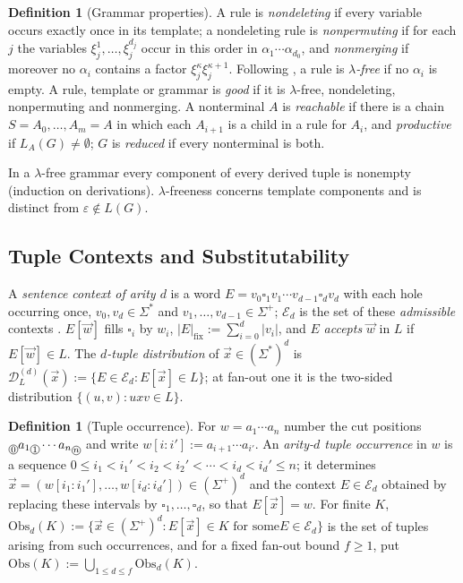 \documentclass[11pt]{article}
\numberwithin{equation}{section}
\theoremstyle{plain}
\theoremstyle{definition}
\newtheorem{definition}[theorem]{Definition}
\theoremstyle{remark}
\newcommand{\D}{\mathcal{D}}
\newcommand{\tuple}[1]{\vec{#1}}
\newcommand{\blank}{\square}
\newcommand{\eps}{\varepsilon}
\newcommand{\cutpos}[1]{%
  \raisebox{-0.7ex}{%
    \tikz[baseline=(char.base)]{%
      \node[draw,circle,inner sep=0.4pt,font=\scriptsize]
        (char) {\ensuremath{#1}};%
    }%
  }%
}
\begin{document}
\begin{definition}[Grammar properties]
\label{def:grammar-properties}
A rule is \emph{nondeleting} if every variable occurs exactly once in its
template; a nondeleting rule is \emph{nonpermuting} if for each $j$ the
variables $\xi_j^1,\ldots,\xi_j^{d_j}$ occur in this order in
$\alpha_1\cdots\alpha_{d_0}$, and \emph{nonmerging} if moreover no $\alpha_i$
contains a factor $\xi_j^\kappa\xi_j^{\kappa+1}$.  Following
\cite[Section~2.3]{Yoshinaka2011}, a rule is \emph{$\lambda$-free} if no
$\alpha_i$ is empty.  A rule, template or grammar is \emph{good} if it is
$\lambda$-free, nondeleting, nonpermuting and nonmerging.  A nonterminal $A$
is \emph{reachable} if there is a chain $S=A_0,\ldots,A_m=A$ in which each
$A_{i+1}$ is a child in a rule for $A_i$, and \emph{productive} if
$L_A(G)\ne\emptyset$; $G$ is \emph{reduced} if every nonterminal is both.
\end{definition}

In a $\lambda$-free grammar every component of every derived tuple is nonempty
(induction on derivations).  $\lambda$-freeness concerns template components
and is distinct from $\eps\notin L(G)$.

\subsection{Tuple Contexts and Substitutability}

A \emph{sentence context of arity $d$} is a word
$E=v_0\blank_1v_1\cdots v_{d-1}\blank_dv_d$ with each hole occurring once,
$v_0,v_d\in\Sigma^*$ and $v_1,\ldots,v_{d-1}\in\Sigma^+$; $\mathcal E_d$ is the
set of these \emph{admissible} contexts \cite[Section~3.1]{Yoshinaka2011}.
$E[\tuple w]$ fills $\blank_i$ by $w_i$, $|E|_{\mathrm{fix}}:=\sum_{i=0}^d|v_i|$,
and $E$ \emph{accepts} $\tuple w$ in $L$ if $E[\tuple w]\in L$.  The
\emph{$d$-tuple distribution} of $\tuple x\in(\Sigma^*)^d$ is
$\D_L^{(d)}(\tuple x):=\{E\in\mathcal E_d:E[\tuple x]\in L\}$; at fan-out one
it is the two-sided distribution $\{(u,v):uxv\in L\}$.

\begin{definition}[Tuple occurrence]
\label{def:tuple-occurrence}
For $w=a_1\cdots a_n$ number the cut positions
$\cutpos{0}a_1\cutpos{1}\cdots a_n\cutpos{n}$ and write
$w[i:i']:=a_{i+1}\cdots a_{i'}$.  An \emph{arity-$d$ tuple occurrence} in $w$
is a sequence $0\le i_1<i_1'<i_2<i_2'<\cdots<i_d<i_d'\le n$; it determines
$\tuple x=(w[i_1:i_1'],\ldots,w[i_d:i_d'])\in(\Sigma^+)^d$ and the context
$E\in\mathcal E_d$ obtained by replacing these intervals by
$\blank_1,\ldots,\blank_d$, so that $E[\tuple x]=w$.  For finite $K$,
$\mathrm{Obs}_d(K):=\{\tuple x\in(\Sigma^+)^d:E[\tuple x]\in K\text{ for some
}E\in\mathcal E_d\}$ is the set of tuples arising from such occurrences, and
for a fixed fan-out bound $f\ge1$, put
$\mathrm{Obs}(K):=\bigcup_{1\le d\le f}\mathrm{Obs}_d(K)$.
\end{definition}
\end{document}

